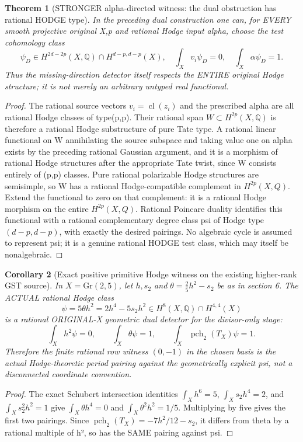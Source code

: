 \documentclass[11pt]{article}
\newtheorem{theorem}{Theorem}[section]
\newtheorem{corollary}[theorem]{Corollary}
\begin{document}
\begin{theorem}[STRONGER alpha-directed witness: the dual obstruction has rational HODGE type]
In the preceding dual
construction one can, for
EVERY smooth projective
original X,p and rational
Hodge input alpha, choose
the test cohomology class
\[
 \boxed{
 \psi_D\in
 H^{2d-2p}(X,\mathbb Q)
          \cap H^{d-p,d-p}(X),
 \quad
 \int_Xv_i\psi_D=0,\quad
 \int_X\alpha\psi_D=1.
 }                                                     \tag{16}
\]
Thus the missing-direction
detector itself respects the
ENTIRE original Hodge
structure; it is not
merely an arbitrary
untyped real functional.
\end{theorem}
\begin{proof}
The rational source vectors
$v_i=\operatorname{cl}(z_i)$
and the prescribed alpha
are all rational Hodge
classes of type(p,p).
Their rational span
$W\subset H^{2p}(X,\mathbb Q)$
is therefore a rational
Hodge substructure of pure
Tate type. A rational
linear functional on W
annihilating the source
subspace and taking value
one on alpha exists by
the preceding rational
Gaussian argument, and it
is a morphism of rational
Hodge structures after
the appropriate Tate twist,
since W consists entirely
of (p,p) classes.
Pure rational polarizable
Hodge structures are
semisimple, so W has a
rational Hodge-compatible
complement in $H^{2p}(X,Q)$.
Extend the functional
to zero on that complement:
it is a rational Hodge
morphism on the entire
$H^{2p}(X,Q)$.
Rational Poincare duality
identifies this functional
with a rational
complementary degree
class psi of Hodge type
$(d-p,d-p)$, with exactly
the desired pairings.
No algebraic cycle is
assumed to represent psi;
it is a genuine rational
HODGE test class, which
may itself be nonalgebraic.
\end{proof}

\begin{corollary}[Exact positive primitive Hodge witness on the existing higher-rank GST source]
In $X=\mathrm{Gr}(2,5)$,
let $h,s_2$ and
$\theta=\tfrac25h^2-s_2$
be as in section 6.
The ACTUAL rational
Hodge class
\[
 \boxed{
 \psi=5\theta h^2
      =2h^4-5s_2h^2
       \in H^{8}(X,\mathbb Q)
                \cap H^{4,4}(X)
 }                                                     \tag{17}
\]
is a rational
ORIGINAL-X geometric
dual detector for the
divisor-only stage:
\[
 \boxed{
 \int_Xh^2\psi=0,\qquad
 \int_X\theta\psi=1,\qquad
 \int_X\operatorname{pch}_2(T_X)\psi=1.
 }                                                     \tag{18}
\]
Therefore the finite
rational row witness
$(0,-1)$ in the chosen
basis is the actual
Hodge-theoretic
period pairing against
the geometrically
explicit psi, not
a disconnected
coordinate convention.
\end{corollary}
\begin{proof}
The exact Schubert
intersection identities
$\int_Xh^6=5$,
$\int_Xs_2h^4=2$,
and $\int_Xs_2^2h^2=1$
give
$\int_X\theta h^4=0$
and
$\int_X\theta^2h^2=1/5$.
Multiplying by five gives
the first two pairings.
Since
$\operatorname{pch}_2(T_X)
=-7h^2/12-s_2$,
it differs from theta
by a rational multiple
of h², so has the SAME
pairing against psi.
\end{proof}
\end{document}
